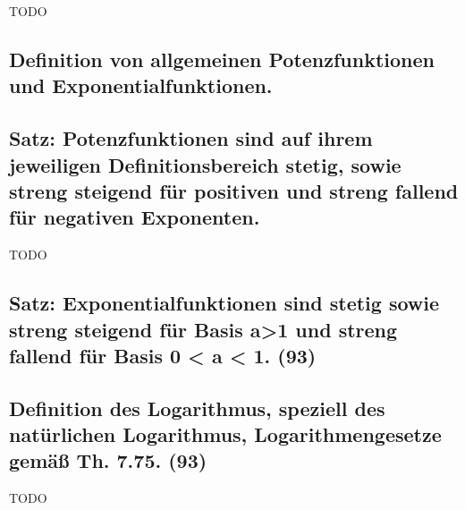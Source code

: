 TODO

\subsection{Definition von allgemeinen Potenzfunktionen und Exponentialfunktionen.}

\subsection{Satz: Potenzfunktionen sind auf ihrem jeweiligen Definitionsbereich stetig, sowie streng steigend für positiven und streng fallend für negativen Exponenten.}

TODO

\subsection{Satz: Exponentialfunktionen sind stetig sowie streng steigend für Basis a>1 und streng fallend für Basis 0 < a < 1. (93)}

\subsection{Definition des Logarithmus, speziell des natürlichen Logarithmus, Logarithmengesetze gemäß Th. 7.75. (93)}

TODO
